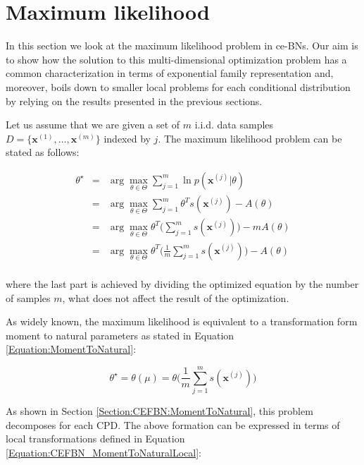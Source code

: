 \documentclass[11pt, oneside]{article}   	%
\newcommand{\bm}{\mathbf}
\numberwithin{figure}{section}
\numberwithin{equation}{section}
\numberwithin{table}{section}
\theoremstyle{definition}
\begin{document}
\section{Maximum likelihood}

In this section we look at the maximum likelihood problem in ce-BNs. Our aim is to show how the solution to this multi-dimensional optimization problem has a common characterization in terms of exponential family representation and, moreover, boils down to smaller local problems for each conditional distribution by relying on the results presented in the previous sections. 


Let us assume that we are given a set of $m$ i.i.d. data samples $D=\{\bm x^{(1)}, \ldots, \bm x^{(m)}\}$ indexed by $j$. The maximum likelihood problem can be stated as follows:

\begin{eqnarray*}
\theta^\star  &=& \arg\max_{\theta \in \Theta} \sum_{j=1}^m \ln p(\bm x^{(j)}|\theta) \\
&=& \arg\max_{\theta \in \Theta} \sum_{j=1}^m \theta^Ts(\bm x^{(j)})  - A(\theta) \\
&=& \arg\max_{\theta \in \Theta} \theta^T\Big(\sum_{j=1}^m s(\bm x^{(j)})\Big)  - m A(\theta) \\
&=& \arg\max_{\theta \in \Theta} \theta^T\Big(\frac{1}{m}\sum_{j=1}^m s(\bm x^{(j)})\Big)  - A(\theta) \\
\end{eqnarray*}

\noindent where the last part is achieved by dividing the optimized equation by the number of samples $m$, what does not affect the result of the optimization. 

As widely known, the maximum likelihood is equivalent to a transformation form moment to natural parameters as stated in Equation \ref{Equation:MomentToNatural}: 

$$\theta^\star = \theta (\mu) = \theta\Big(\frac{1}{m}\sum_{j=1}^m s(\bm x^{(j)})\Big)$$

As shown in Section \ref{Section:CEFBN:MomentToNatural}, this problem decomposes for each CPD. The above formation can be expressed in terms of local transformations defined in Equation \ref{Equation:CEFBN_MomentToNaturalLocal}:
\end{document}
